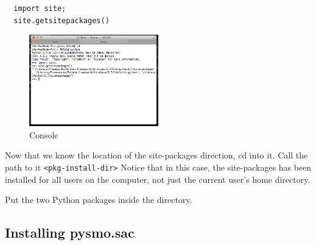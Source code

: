 \documentclass[letterpaper,10pt]{article}
\begin{document}
\begin{verbatim}
  import site;
  site.getsitepackages()
\end{verbatim}

\begin{figure}[h!]
  \centering
  \includegraphics[width=0.5\textwidth]{images/site_package_location}
  \caption{Console}
  \label{fig:site_package_location}
\end{figure}

Now that we know the location of the site-packages direction, cd into it. Call the path to it \verb"<pkg-install-dir>" Notice that in this case, the site-packages has been installed for all users on the computer, not just the current user's home directory. 

Put the two Python packages inside the directory.

\subsection{Installing pysmo.sac}


















\end{document}
